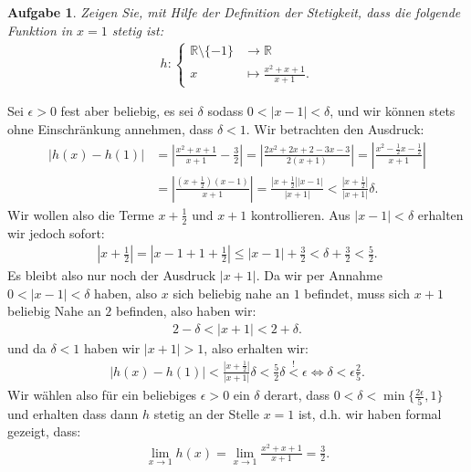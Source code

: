 \documentclass[a4paper, 20]{exam}
\newtheorem{ex}{Aufgabe}
\begin{document}
\begin{ex}
Zeigen Sie, mit Hilfe der Definition der Stetigkeit, dass die folgende Funktion in $x=1$ stetig ist:
\begin{align*}
h: \begin{cases} \mathbb{R} \setminus \lbrace -1 \rbrace & \longrightarrow \mathbb{R} \\
x & \longmapsto \frac{x^2+x+1}{x+1}. \end{cases}
\end{align*}
\end{ex}


\begin{solution}
Sei $ \epsilon >0$ fest aber beliebig, es sei $\delta$ sodass $0< |x-1| < \delta$, und wir können stets ohne Einschränkung annehmen, dass $\delta < 1$. Wir betrachten den Ausdruck:
\begin{align*}
|h(x)-h(1)| &= \left| \frac{x^2 + x +1}{x+1} - \frac{3}{2} \right| = \left| \frac{2x^2+2x+2-3x-3}{2(x+1)} \right| = \left| \frac{x^2- \frac{1}{2}x- \frac{1}{2}}{x+1} \right| \\
& = \left| \frac{ \left( x + \frac{1}{2}\right) (x-1)}{x+1} \right| = \frac{ \left| x + \frac{1}{2}\right| |x-1|}{|x+1|} < \frac{\left|x + \frac{1}{2} \right|}{|x+1|} \delta.
\end{align*}
Wir wollen also die Terme $x+ \frac{1}{2}$ und $x+1$ kontrollieren. Aus $|x-1| < \delta$ erhalten wir jedoch sofort:
\begin{align*}
\left| x + \frac{1}{2} \right| = \left| x -1 +1 + \frac{1}{2} \right| \leq |x-1| + \frac{3}{2} < \delta + \frac{3}{2}< \frac{5}{2}.
\end{align*}
Es bleibt also nur noch der Ausdruck $|x+1|$. Da wir per Annahme $0 < |x-1| < \delta$ haben,  also $x$ sich beliebig nahe an $1$ befindet, muss sich $x+1$ beliebig Nahe an $2$ befinden, also haben wir:
\begin{align*}
2 -\delta < |x+1| < 2 + \delta.
\end{align*}
und da $\delta <1$ haben wir $|x+1| >1$, also erhalten wir:
\begin{align*}
|h(x)-h(1)| < \frac{\left| x + \frac{1}{2} \right|}{|x+1|} \delta < \frac{5}{2} \delta \overset{!}< \epsilon \iff \delta < \epsilon \frac{2}{5}.
\end{align*} 
Wir wählen also für ein beliebiges $\epsilon >0$ ein $\delta$ derart, dass $0 < \delta < \min \lbrace \frac{2\epsilon}{5},1 \rbrace$ und erhalten dass dann $h$ stetig an der Stelle $x=1$ ist, d.h. wir haben formal gezeigt, dass:
\begin{align*}
\lim_{x \rightarrow 1} h(x) = \lim_{x \rightarrow 1} \frac{x^2 + x+1}{x+1} = \frac{3}{2}.
\end{align*}
\end{solution}
\end{document}
